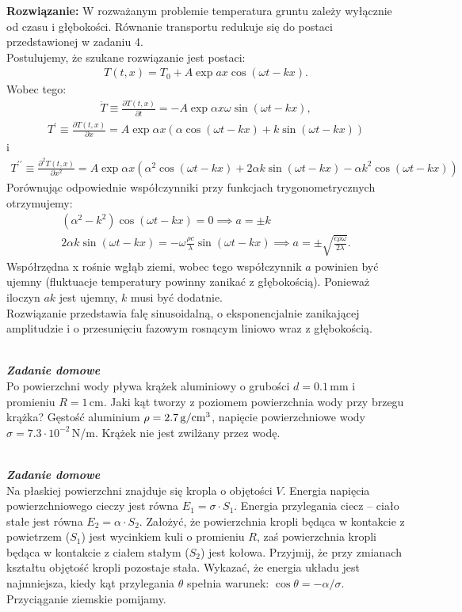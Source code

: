\documentclass[11pt,a4paper]{article}
\newcounter{zaddom}\newcommand{\zaddom}[1][]{\addtocounter{zaddom}{1} ~\\  {\bf \emph{Zadanie domowe \arabic{zaddom} #1 }} \\}
\begin{document}
\vspace{0.2cm}
\textbf{Rozwiązanie:} W rozważanym problemie temperatura gruntu zależy wyłącznie od czasu i głębokości. Równanie transportu redukuje się do postaci przedstawionej w zadaniu 4. \\
Postulujemy, że szukane rozwiązanie jest postaci:
\begin{align}
T(t, x) =T_0 + A \exp{a x} \cos{(\omega t - kx)}.
\end{align}
Wobec tego:
\begin{align}
\dot{T} \equiv \frac{\partial T(t, x)}{\partial t} =- A \exp{\alpha x}\omega \sin{(\omega t - kx)},
\end{align}
\begin{align}
T^\prime \equiv \frac{\partial T(t, x)}{\partial x} = A \exp{\alpha x} \left(\alpha \cos{(\omega t - kx)} + k \sin{(\omega t - kx)}\right)
\end{align}
i 
\begin{align}
T^{\prime\prime} \equiv \frac{\partial^2 T(t, x)}{\partial x^2} = A \exp{\alpha x} \left(\alpha^2 \cos{(\omega t - kx)} + 2 \alpha k \sin{(\omega t - kx)}-  \alpha k^2 \cos{(\omega t - kx)}\right)
\end{align}
Porównując odpowiednie współczynniki przy funkcjach trygonometrycznych otrzymujemy:
\begin{align}
(\alpha^2 - k^2)\cos{(\omega t - kx)} = 0 \implies a= \pm k\\ 
2 \alpha k \sin{(\omega t - kx)} = - \omega \frac{\rho c}{\lambda} \sin{(\omega t - kx)} \implies a = \pm \sqrt{\frac{c \rho \omega}{2 \lambda}}.
\end{align}
Współrzędna x rośnie wgłąb ziemi, wobec tego współczynnik $a$ powinien być ujemny (fluktuacje temperatury powinny zanikać z głębokością). Ponieważ iloczyn $a k$ jest ujemny, $k$ musi być dodatnie.\\
Rozwiązanie przedstawia  falę sinusoidalną,  o eksponencjalnie zanikającej amplitudzie i o przesunięciu fazowym rosnącym liniowo wraz z głębokością. 
\newpage 
\zaddom
Po powierzchni wody pływa krążek aluminiowy o grubości
$d = 0.1\,$mm i promieniu $R = 1\,$cm.
Jaki kąt tworzy z poziomem powierzchnia wody przy brzegu krążka?
Gęstość aluminium $\rho = 2.7\,{\rm g/cm^3}$,
napięcie powierzchniowe wody $\sigma = 7.3\cdot 10^{-2}\,$N/m.
Krążek nie jest zwilżany przez wodę.


\zaddom
Na płaskiej powierzchni znajduje się kropla o objętości $V$.
Energia napięcia powierzchniowego cieczy jest równa $E_1 = \sigma \cdot S_1$.
Energia przylegania ciecz -- ciało stałe jest równa $E_2 = \alpha \cdot S_2$.
Założyć, że powierzchnia kropli będąca w kontakcie z powietrzem ($S_1$)
jest wycinkiem kuli o promieniu $R$, zaś powierzchnia kropli będąca
w kontakcie z ciałem stałym ($S_2$) jest kołowa. Przyjmij, że przy zmianach
kształtu objętość kropli pozostaje stała.
Wykazać, że energia układu jest najmniejsza, kiedy kąt przylegania
$\theta$ spełnia warunek: $\cos{\theta} = -\alpha/\sigma$.
Przyciąganie ziemskie pomijamy.
\end{document}
